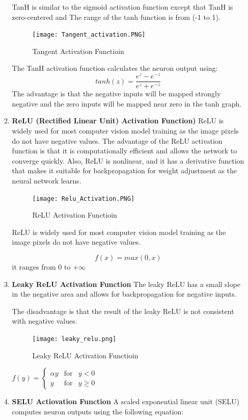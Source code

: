 \begin{itemize}
\begin{enumerate}
    TanH is similar to the sigmoid activation function except that TanH is zero-centered and The range of the tanh function is from (-1 to 1).
    
    \begin{figure}[H]
        \centering\texttt{[image: Tangent\_activation.PNG]}
        \caption{Tangent Activation Functioin}
    \end{figure}
    
    The TanH activation function calculates the neuron output using:\\
    $$tanh(z)=\frac{e^{z}-e^{-z}}{e^{z}+e^{-z}}$$
    The advantage is that the negative inputs will be mapped strongly negative and the zero inputs will be mapped near zero in the tanh graph.
    \item \textbf{ReLU (Rectified Linear Unit) Activation Function)}
    ReLU is widely used for most computer vision model training as the image pixels do not have negative values. The advantage of the ReLU activation function is that it is computationally efficient and allows the network to converge quickly. Also, ReLU is nonlinear, and it has a derivative function that makes it suitable for backpropagation for weight adjustment as the neural network learns.
    
    \begin{figure}[H]
        \centering\texttt{[image: Relu\_Activation.PNG]}
        \caption{ReLU Activation Functioin}
    \end{figure}
    
    ReLU is widely used for most computer vision model training as the image pixels do not have negative values.
    
    $$f(x)=max(0,x)$$
    it ranges from 0 to +$\infty$\\
    \item  \textbf{Leaky ReLU Activation Function}
    The leaky ReLU has a small slope in the negative area and allows for backpropagation for negative inputs.
    
    The disadvantage is that the result of the leaky ReLU is not consistent with negative values.
    \begin{figure}[H]
        \centering\texttt{[image: leaky\_relu.png]}
        \caption{Leaky ReLU Activation Functioin}
    \end{figure}
    
    $f(y)=\left\{\begin{array}{rcl}
         \alpha y & \mbox{for} & y<0\\
         y & \mbox{for} & y\geq 0
    \end{array}\right.$\\
    \item \textbf{SELU Actiovation Function}
    A scaled exponential linear unit (SELU) computes neuron outputs using the following equation:
    

\end{enumerate}
\end{itemize}
